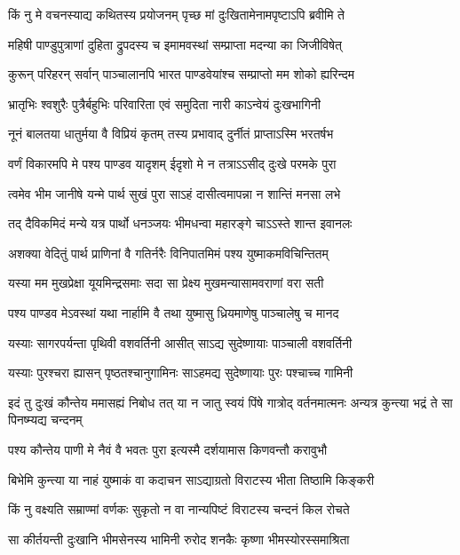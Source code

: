 \twolineshloka
{किं नु मे वचनस्याद्य कथितस्य प्रयोजनम्}
{पृच्छ मां दुःखितामेनामपृष्टाऽपि ब्रवीमि ते}


\twolineshloka
{महिषी पाण्डुपुत्राणां दुहिता द्रुपदस्य च}
{इमामवस्थां सम्प्राप्ता मदन्या का जिजीविषेत्}


\twolineshloka
{कुरून् परिहरन् सर्वान् पाञ्चालानपि भारत}
{पाण्डवेयांश्च सम्प्राप्तो मम शोको ह्यरिन्दम}


\twolineshloka
{भ्रातृभिः श्वशुरैः पुत्रैर्बहुभिः परिवारिता}
{एवं समुदिता नारी काऽन्वेयं दुःखभागिनी}


\twolineshloka
{नूनं बालतया धातुर्मया वै विप्रियं कृतम्}
{तस्य प्रभावाद् दुर्नीतं प्राप्ताऽस्मि भरतर्षभ}


\twolineshloka
{वर्णं विकारमपि मे पश्य पाण्डव यादृशम्}
{ईदृशो मे न तत्राऽऽसीद् दुःखे परमके पुरा}


\twolineshloka
{त्वमेव भीम जानीषे यन्मे पार्थ सुखं पुरा}
{साऽहं दासीत्वमापन्ना न शान्तिं मनसा लभे}


\twolineshloka
{तद् दैविकमिदं मन्ये यत्र पार्थो धनञ्जयः}
{भीमधन्वा महारङ्गे चाऽऽस्ते शान्त इवानलः}


\twolineshloka
{अशक्या वेदितुं पार्थ प्राणिनां वै गतिर्नरैः}
{विनिपातमिमं पश्य युष्माकमविचिन्तितम्}


\twolineshloka
{यस्या मम मुखप्रेक्षा यूयमिन्द्रसमाः सदा}
{सा प्रेक्ष्य मुखमन्यासामवराणां वरा सती}


\twolineshloka
{पश्य पाण्डव मेऽवस्थां यथा नार्हामि वै तथा}
{युष्मासु ध्रियमाणेषु पाञ्चालेषु च मानद}


\twolineshloka
{यस्याः सागरपर्यन्ता पृथिवी वशवर्तिनी}
{आसीत् साऽद्य सुदेष्णायाः पाञ्चाली वशवर्तिनी}


\twolineshloka
{यस्याः पुरश्चरा ह्यासन् पृष्ठतश्चानुगामिनः}
{साऽहमद्य सुदेष्णायाः पुरः पश्चाच्च गामिनी}


\threelineshloka
{इदं तु दुःखं कौन्तेय ममासह्यं निबोध तत्}
{या न जातु स्वयं पिंषे गात्रोद् वर्तनमात्मनः}
{अन्यत्र कुन्त्या भद्रं ते सा पिनष्म्यद्य चन्दनम्}


\twolineshloka
{पश्य कौन्तेय पाणी मे नैवं वै भवतः पुरा}
{इत्यस्मै दर्शयामास किणवन्तौ करावुभौ}


\twolineshloka
{बिभेमि कुन्त्या या नाहं युष्माकं वा कदाचन}
{साऽद्याग्रतो विराटस्य भीता तिष्ठामि किङ्करी}


\twolineshloka
{किं नु वक्ष्यति सम्राण्मां वर्णकः सुकृतो न वा}
{नान्यपिष्टं विराटस्य चन्दनं किल रोचते}



\twolineshloka
{सा कीर्तयन्ती दुःखानि भीमसेनस्य भामिनी}
{रुरोद शनकैः कृष्णा भीमस्योरस्समाश्रिता}


